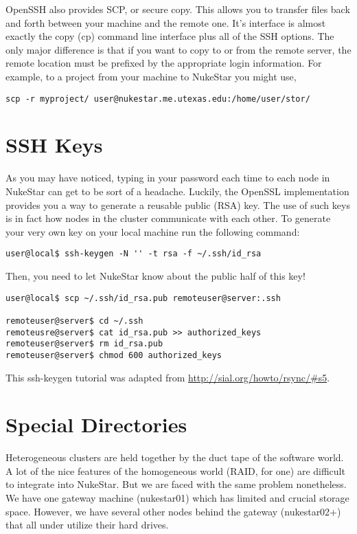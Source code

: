 \documentclass[a4paper, 12pt]{article}
\begin{document}
OpenSSH also provides SCP, or secure copy.  This allows you to transfer files back and forth between your machine and 
the remote one.  It's interface is almost exactly the copy (cp) command line interface plus all of the SSH options.  
The only major difference is that if you want to copy to or from the remote server, the remote location must be prefixed 
by the appropriate login information.  For example, to a project from your machine to NukeStar you might use, 
\begin{verbatim}
scp -r myproject/ user@nukestar.me.utexas.edu:/home/user/stor/
\end{verbatim}

\section{SSH Keys} 
As you may have noticed, typing in your password each time to each node in NukeStar can get to be sort of a headache.
Luckily, the OpenSSL implementation provides you a way to generate a reusable public (RSA) key. The use of such keys is 
in fact how nodes in the cluster communicate with each other.  To generate your very own key
on your local machine run the following command:
\begin{verbatim}
user@local$ ssh-keygen -N '' -t rsa -f ~/.ssh/id_rsa
\end{verbatim}
Then, you need to let NukeStar know about the public half of this key!
\begin{verbatim}
user@local$ scp ~/.ssh/id_rsa.pub remoteuser@server:.ssh

remoteuser@server$ cd ~/.ssh
remoteusre@server$ cat id_rsa.pub >> authorized_keys
remoteuser@server$ rm id_rsa.pub
remoteuser@server$ chmod 600 authorized_keys
\end{verbatim}
This ssh-keygen tutorial was adapted from \url{http://sial.org/howto/rsync/#s5}.

\section{Special Directories} 
Heterogeneous clusters are held together by the duct tape of the software world.  A lot of the nice
features of the homogeneous world (RAID, for one) are difficult to integrate into NukeStar.  But we are faced with the 
same problem nonetheless.  We have one gateway machine (nukestar01) which has limited and crucial storage space.  
However, we have several other nodes behind the gateway (nukestar02+) that all under utilize their hard drives.  
\end{document}

